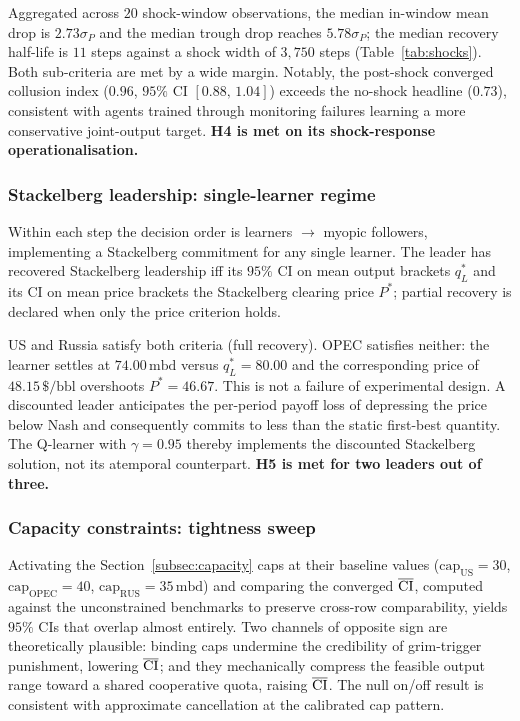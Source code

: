Aggregated across $20$ shock-window observations, the median
in-window mean drop is $2.73\sigma_P$ and the median trough
drop reaches $5.78\sigma_P$; the median recovery half-life is
$11$ steps against a shock width of $3{,}750$ steps
(Table~\ref{tab:shocks}). Both sub-criteria are met by a wide
margin. Notably, the post-shock converged collusion index
($0.96$, $95\%$ CI $[0.88,\,1.04]$) exceeds the no-shock
headline ($0.73$), consistent with agents trained through
monitoring failures learning a more conservative joint-output
target. \textbf{H4 is met on its shock-response
operationalisation.}


\subsubsection{Stackelberg leadership: single-learner regime}
\label{subsec:stack}

Within each step the decision order is learners $\rightarrow$
myopic followers, implementing a Stackelberg commitment for any
single learner. The leader has recovered Stackelberg leadership
iff its $95\%$ CI on mean output brackets $q_L^\ast$ and
its CI on mean price brackets the Stackelberg clearing price
$P^\ast$; partial recovery is declared when only the price
criterion holds.

US and Russia satisfy both criteria (full recovery). OPEC
satisfies neither: the learner settles at
$74.00\,\text{mbd}$ versus $q_L^\ast = 80.00$ and the
corresponding price of $48.15\,\$\text{/bbl}$ overshoots
$P^\ast = 46.67$. This is not a failure of experimental design.
A discounted leader anticipates the per-period payoff
loss of depressing the price below Nash and consequently commits
to less than the static first-best quantity. The Q-learner with
$\gamma = 0.95$ thereby implements the discounted
Stackelberg solution, not its atemporal counterpart.
\textbf{H5 is met for two leaders out of three.}

\subsubsection{Capacity constraints: tightness sweep}
\label{subsec:cap}

Activating the Section~\ref{subsec:capacity} caps at their baseline values
($\text{cap}_{\text{US}} = 30$, $\text{cap}_{\text{OPEC}} = 40$,
$\text{cap}_{\text{RUS}} = 35\,\text{mbd}$) and comparing the
converged $\overline{\mathrm{CI}}$, computed against the unconstrained benchmarks
to preserve cross-row comparability, yields $95\%$ CIs that
overlap almost entirely. Two channels of opposite sign are
theoretically plausible: binding caps undermine the credibility
of grim-trigger punishment, lowering $\overline{\mathrm{CI}}$; and they
mechanically compress the feasible output range toward a shared
cooperative quota, raising $\overline{\mathrm{CI}}$. The null on/off result is
consistent with approximate cancellation at the calibrated cap
pattern.

